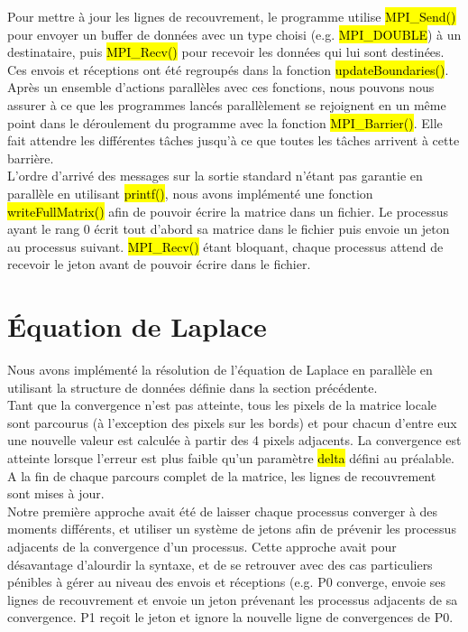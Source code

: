 \documentclass[a4paper,table]{article}
\begin{document}
Pour mettre à jour les lignes de recouvrement, le programme utilise
\hl{MPI\_Send()} pour envoyer un buffer de données avec un type choisi
(e.g. \hl{MPI\_DOUBLE}) à un destinataire, puis \hl{MPI\_Recv()} pour recevoir
les données qui lui sont destinées. Ces envois et réceptions ont été regroupés
dans la fonction \hl{updateBoundaries()}. \\

Après un ensemble d'actions parallèles avec ces fonctions, nous pouvons nous
assurer à ce que les programmes lancés parallèlement se rejoignent en un même
point dans le déroulement du programme avec la fonction \hl{MPI\_Barrier()}.
Elle fait attendre les différentes tâches jusqu'à ce que toutes les tâches
arrivent à cette barrière. \\

L'ordre d'arrivé des messages sur la sortie standard n'étant pas garantie en
parallèle en utilisant \hl{printf()}, nous avons implémenté une fonction
\hl{writeFullMatrix()} afin de pouvoir écrire la matrice dans un fichier.
Le processus ayant le rang 0 écrit tout d'abord sa matrice dans le fichier
puis envoie un jeton au processus suivant. \hl{MPI\_Recv()} étant bloquant,
chaque processus attend de recevoir le jeton avant de pouvoir écrire dans le
fichier.
\newpage

\section{Équation de Laplace}

Nous avons implémenté la résolution de l'équation de Laplace en parallèle en
utilisant la structure de données définie dans la section précédente.\\

Tant que la convergence n'est pas atteinte, tous les pixels de la matrice
locale sont parcourus (à l'exception des pixels sur les bords) et pour chacun
d'entre eux une nouvelle valeur est calculée à partir des 4 pixels adjacents.
La convergence est atteinte lorsque l'erreur est plus faible qu'un paramètre
\hl{delta} défini au préalable. A la fin de chaque parcours complet de la
matrice, les lignes de recouvrement sont mises à jour.\\

Notre première approche avait été de laisser chaque processus converger à des
moments différents, et utiliser un système de jetons afin de prévenir les
processus adjacents de la convergence d'un processus. Cette approche avait
pour désavantage d'alourdir la syntaxe, et de se retrouver avec des cas
particuliers pénibles à gérer au niveau des envois et réceptions (e.g.
P0 converge, envoie ses lignes de recouvrement et envoie un jeton prévenant
les processus adjacents de sa convergence. P1 reçoit le jeton et ignore la
nouvelle ligne de convergences de P0.\\
\end{document}

